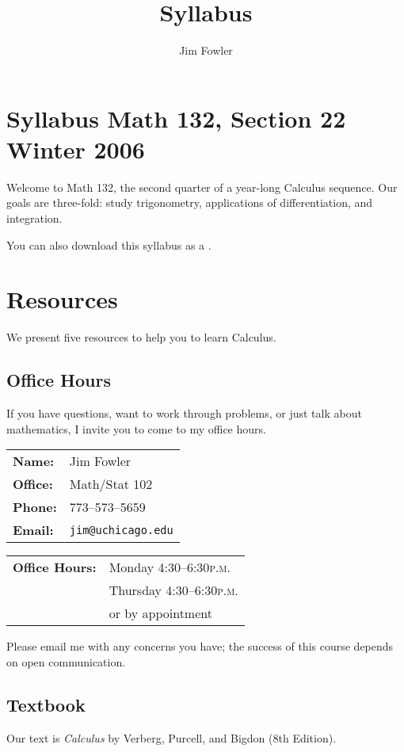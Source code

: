 \documentclass[12pt,letterpaper]{article}
\title{Syllabus}
\author{Jim Fowler}
\newcommand{\peem}{\textsc{p.m.}}
\begin{document}
\section*{\Large\sf Syllabus\hfill
Math 132, Section 22\hfill
Winter 2006}

Welcome to Math 132, the second quarter of a year-long Calculus
sequence.  Our goals are three-fold: study trigonometry, applications
of differentiation, and integration.

\begin{htmlonly}
You can also download this syllabus as a .
\end{htmlonly}

\section*{Resources}

We present five resources to help you to learn Calculus.

\subsection*{Office Hours}
If you have questions, want to work through problems, or just talk
about mathematics, I invite you to come to my office hours.
\begin{multicols}{2}
\begin{tabular}{ll}
\textbf{Name:} & Jim Fowler \\
\textbf{Office:} & Math/Stat 102 \\
\textbf{Phone:} & 773--573--5659 \\
\textbf{Email:} & \texttt{jim@uchicago.edu}
\end{tabular}

\begin{tabular}{ll}
\textbf{Office Hours:} & Monday 4:30--6:30\peem \\
& Thursday 4:30--6:30\peem \\
& or by appointment
\end{tabular}
\end{multicols}
\noindent
Please email me with any concerns you have; the success of this course
depends on open communication.

\subsection*{Textbook}
Our text is \textit{Calculus} by Verberg, Purcell, and Bigdon (8th
Edition).
\end{document}
